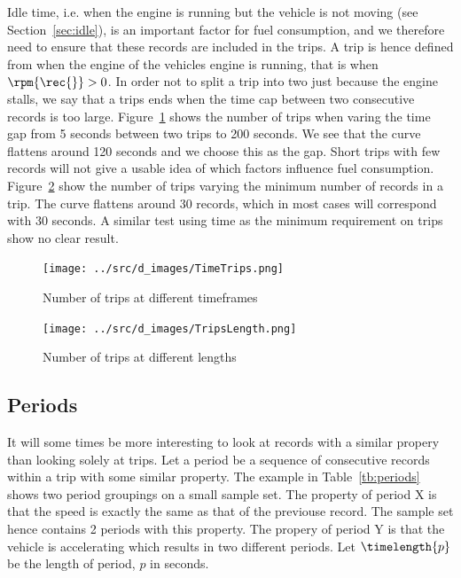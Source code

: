 Idle time, i.e. when the engine is running but the vehicle is not moving (see Section~\ref{sec:idle}), is an important factor for fuel consumption, and we therefore need to ensure that these records are included in the trips. 
A trip is hence defined from when the engine of the vehicles engine is running, that is when $\rpm{\rec{}}> 0$.
In order not to split a trip into two just because the engine stalls, we say that a trips ends when the time cap between two consecutive records is too large.
Figure~\ref{fig:TimeTrips} shows the number of trips when varing the time gap from 5 seconds between two trips to 200 seconds.
We see that the curve flattens around 120 seconds and we choose this as the gap.
Short trips with few records will not give a usable idea of which factors influence fuel consumption.
Figure~\ref{fig:LengthTrips} show the number of trips varying the minimum number of records in a trip.
The curve flattens around 30 records, which in most cases will correspond with 30 seconds. 
A similar test using time as the minimum requirement on trips show no clear result. 
\begin{figure}[htb]
\centering
\texttt{[image: ../src/d\_images/TimeTrips.png]}
\caption{Number of trips at different timeframes}
\label{fig:TimeTrips}
\end{figure}
\begin{figure}[htb]
\centering
\texttt{[image: ../src/d\_images/TripsLength.png]}
\caption{Number of trips at different lengths}
\label{fig:LengthTrips}
\end{figure}

\subsection{Periods}\label{sec:periods}%
It will some times be more interesting to look at records with a similar propery than looking solely at trips.
Let a period be a sequence of consecutive records within a trip with some similar property.
The example in Table~\ref{tb:periods} shows two period groupings on a small sample set.
The property of period X is that the speed is exactly the same as that of the previouse record.
The sample set hence contains 2 periods with this property.
The propery of period Y is that the vehicle is accelerating which results in two different periods.
Let $\timelength{p}$ be the length of period, $p$ in seconds. %

